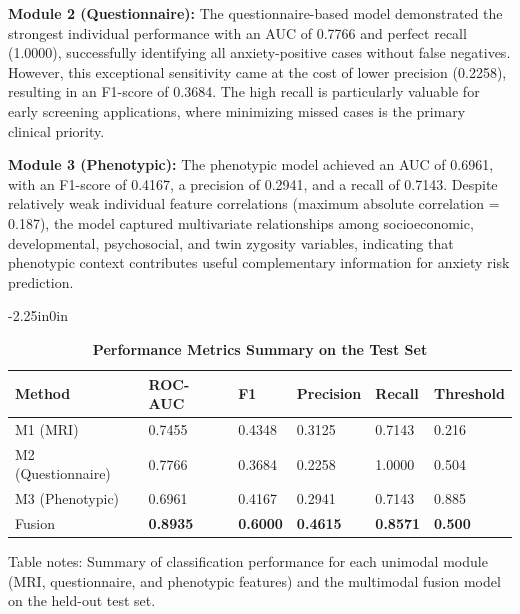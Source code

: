 \documentclass[10pt,letterpaper]{article}
\begin{document}
\textbf{Module 2 (Questionnaire):} The questionnaire-based model demonstrated the strongest individual performance with an AUC of 0.7766 and perfect recall (1.0000), successfully identifying all anxiety-positive cases without false negatives. However, this exceptional sensitivity came at the cost of lower precision (0.2258), resulting in an F1-score of 0.3684. The high recall is particularly valuable for early screening applications, where minimizing missed cases is the primary clinical priority.

\textbf{Module 3 (Phenotypic):} The phenotypic model achieved an AUC of 0.6961, with an F1-score of 0.4167, a precision of 0.2941, and a recall of 0.7143. Despite relatively weak individual feature correlations (maximum absolute correlation = 0.187), the model captured multivariate relationships among socioeconomic, developmental, psychosocial, and twin zygosity variables, indicating that phenotypic context contributes useful complementary information for anxiety risk prediction.

\begin{table}[!t]
\begin{adjustwidth}{-2.25in}{0in}
\centering
\caption{\textbf{Performance Metrics Summary on the Test Set}}
\label{tab:performance_summary}
\footnotesize
\renewcommand{\arraystretch}{1.15}

\begin{tabular}{|p{3.0cm}|p{2.0cm}|p{2.0cm}|p{2.0cm}|p{2.0cm}|p{2.0cm}|}
\hline
\textbf{Method} & \textbf{ROC-AUC} & \textbf{F1} & \textbf{Precision} & \textbf{Recall} & \textbf{Threshold} \\
\hline

M1 (MRI)
& 0.7455
& 0.4348
& 0.3125
& 0.7143
& 0.216 \\
\hline

M2 (Questionnaire)
& 0.7766
& 0.3684
& 0.2258
& 1.0000
& 0.504 \\
\hline

M3 (Phenotypic)
& 0.6961
& 0.4167
& 0.2941
& 0.7143
& 0.885 \\
\hline

Fusion
& \textbf{0.8935}
& \textbf{0.6000}
& \textbf{0.4615}
& \textbf{0.8571}
& \textbf{0.500} \\
\hline

\end{tabular}

\begin{flushleft}
Table notes: Summary of classification performance for each unimodal module
(MRI, questionnaire, and phenotypic features) and the multimodal fusion
model on the held-out test set.
\end{flushleft}

\end{adjustwidth}
\end{table}
\end{document}
